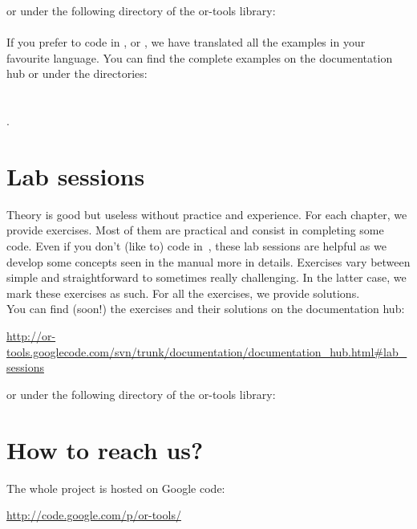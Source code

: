 \begin{titlepage}
or under the following directory of the or-tools library:\\

\\

If you prefer to code in ,  or , we have translated all the examples in your favourite language. You can find the complete examples on the documentation hub or under the directories:\\

\\
\\
.

\section*{Lab sessions}

Theory is good but useless without practice and experience. For each chapter, we provide exercises. Most of them are practical and consist in completing some~ code. 
Even if you don't (like to) code in~, these lab sessions are helpful as we develop some concepts seen in the manual more in details. Exercises vary between simple and 
straightforward to sometimes really challenging. In the latter case, we mark these exercises as such. For all the exercises, we provide solutions.\\

You can find (soon!) the exercises and their solutions on the documentation hub:\\

\begin{center}
  \url{http://or-tools.googlecode.com/svn/trunk/documentation/documentation_hub.html\#lab_sessions}
\end{center}

or under the following directory of the or-tools library:\\


\section*{How to reach us?}
\label{how_to_reach_us}
The whole project  is hosted on Google code:\\
\begin{center}
\url{http://code.google.com/p/or-tools/}\\
\end{center}


\end{titlepage}
